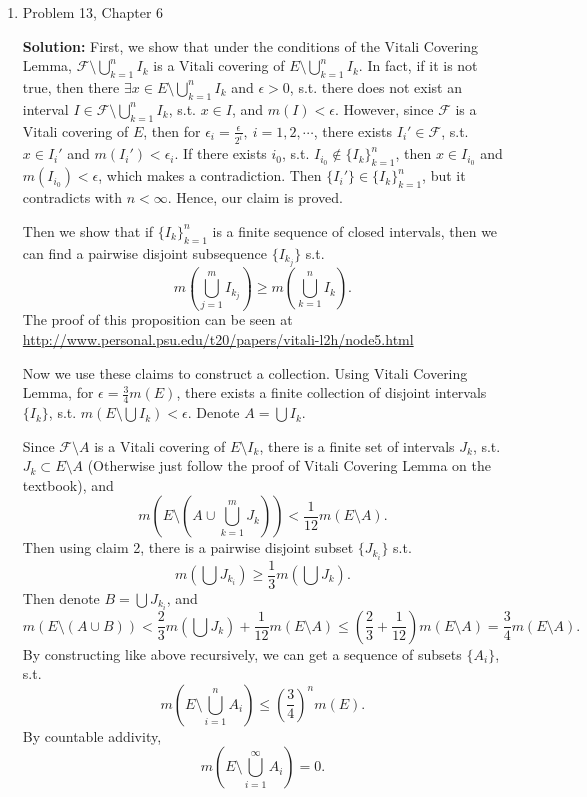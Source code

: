 \documentclass{article}%
\begin{document}
\begin{enumerate}
\bigskip
\item  Problem 13, Chapter 6

\smallskip
\textbf{Solution:}
\smallskip
First, we show that under the conditions of the Vitali Covering Lemma, $\mathcal{F}\setminus \bigcup\limits_{k=1}^n I_k $ is a Vitali covering of $E\setminus \bigcup\limits_{k=1}^n I_k$. In fact, if it is not true, then there $\exists x\in E\setminus\bigcup\limits_{k=1}^n I_k$ and $\epsilon > 0$, s.t. there does not exist an interval $I\in\mathcal{F}\setminus\bigcup\limits_{k=1}^n I_k$, s.t. $x\in I$, and $m(I) < \epsilon$. However, since $\mathcal{F}$ is a Vitali covering of $E$, then for $\epsilon_i = \frac{\epsilon}{2^i}, ~i = 1, 2, \cdots $, there exists $I_i'\in\mathcal{F} $, s.t. $x\in I_i' $ and $m(I_i') < \epsilon_i $. If there exists $i_0 $, s.t. $I_{i_0}\notin \{I_k\}_{k = 1}^{n} $, then $x\in I_{i_0} $ and $m(I_{i_0}) < \epsilon$, which makes a contradiction. Then $\{I_i'\} \in \{I_k\}_{k = 1}^{n}$, but it contradicts with $n < \infty$. Hence, our claim is proved.

Then we show that if $\{I_k\}_{k=1}^{n} $ is a finite sequence of closed intervals, then we can find a pairwise disjoint subsequence $\{I_{k_j}\}$ s.t. 
$$
m(\bigcup_{j = 1}^{m} I_{k_j}) \ge m(\bigcup_{k=1}^{n}I_k).
$$
The proof of this proposition can be seen at \href{http://www.personal.psu.edu/t20/papers/vitali-l2h/node5.html}{http://www.personal.psu.edu/t20/papers/vitali-l2h/node5.html}

Now we use these claims to construct a collection. Using Vitali Covering Lemma, for $\epsilon = \frac{3}{4}m(E)$, there exists a finite collection of disjoint intervals $\{I_k\}$, s.t. $m(E\setminus \bigcup I_k) < \epsilon$. Denote $A = \bigcup I_k $.

Since $\mathcal{F}\setminus A$ is a Vitali covering of $E\setminus I_k $, there is a finite set of intervals $J_k $, s.t. $J_k\subset E\setminus A $ (Otherwise just follow the proof of Vitali Covering Lemma on the textbook), and 
$$
m(E\setminus (A\cup\bigcup_{k=1}^m J_k)) < \frac{1}{12}m(E\setminus A).
$$
Then using claim 2, there is a pairwise disjoint subset $\{J_{k_i}\}$ s.t. 
$$
m(\bigcup J_{k_i}) \ge \frac{1}{3}m(\bigcup J_k).
$$
Then denote $B = \bigcup J_{k_i} $, and 
$$
m(E\setminus (A\cup B)) < \frac{2}{3}m(\bigcup J_k) +\frac{1}{12}m(E\setminus A) \le (\frac{2}{3}+\frac{1}{12})m(E\setminus A) = \frac{3}{4}m(E\setminus A).
$$
By constructing like above recursively, we can get a sequence of subsets $\{A_i\}$, s.t. 
$$
m(E\setminus \bigcup_{i=1}^n A_i) \le (\frac{3}{4})^n m(E).
$$
By countable addivity,
$$
m(E\setminus \bigcup_{i=1}^\infty A_i) = 0.
$$


\end{enumerate}
\end{document}
